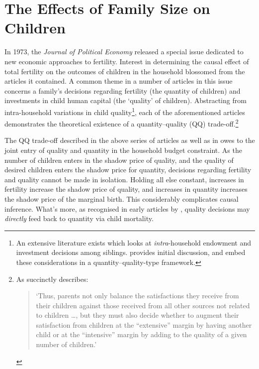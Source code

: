 \section{The Effects of Family Size on Children}
\label{Fscn:kids}
In 1973, the \emph{Journal of Political Economy} released a special issue 
dedicated to new economic approaches to fertility.  Interest in determining
the causal effect of total fertility on the outcomes of children in the 
household blossomed from the articles it contained.  A common theme in a number 
of articles in this issue \citep{BeckerLewis1973, DeTray1973, Willis1973} 
concerns a family's decisions regarding fertility (the quantity of children) 
and investments in child human capital (the `quality' of children). Abstracting 
from intra-household variations in child quality\footnote{An extensive 
literature exists which looks at \emph{intra}-household endowment and investment
decisions among siblings.  \citet{Behrmanetal1982} provides initial discussion,
and \citet{AizerCunha2012} embed these considerations in a quantity--quality-type 
framework.}, each of the aforementioned articles demonstrates the theoretical 
existence of a quantity--quality (QQ) trade-off.\footnote{As \citet{Willis1973} 
succinctly describes:
\begin{quote}
`Thus, parents not only balance the satisfactions they receive from their
children against those received from all other sources not related to 
children \ldots, but they must also decide whether to augment their 
satisfaction from children at the ``extensive'' margin by having another
child or at the ``intensive'' margin by adding to the quality of a given
number of children.'
\end{quote}
}

The QQ trade-off described in the above series of articles as well as in
\citet{BeckerTomes1976,BeckerTomes1986} owes to the joint entry of quality and 
quantity in the household budget constraint.  As the number of children 
enters in the shadow price of quality, and the quality of desired children 
enters the shadow price for quantity, decisions regarding fertility and quality 
cannot be made in isolation.  Holding all else constant, increases in fertility 
increase the shadow price of quality, and increases in quantity increases the
shadow price of the marginal birth. This considerably complicates causal 
inference. What's more, as recognised in early articles by \citet{%
BenPorathWelch1972,BenPorath1976}, quality decisions may \emph{directly} feed
back to quantity via child mortality.

